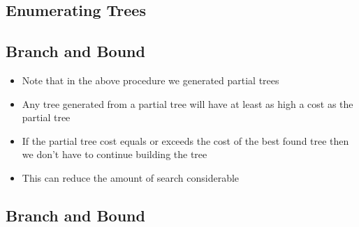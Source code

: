 
\begin{slide}
\section[-2]{Enumerating Trees}

\pause
\pb
{}
\begin{center}
  \pause
\end{center}

\end{slide}


\begin{slide}
\section{Branch and Bound}

\begin{PauseHighLight}
  \begin{itemize}
  \item Note that in the above procedure we generated partial
    trees\pause
  \item Any tree generated from a partial tree will have at least as
    high a cost as the partial tree\pause
  \item If the partial tree cost equals or exceeds the cost of the best
    found tree then we don't have to continue building the tree\pause
  \item This can reduce the amount of search considerable\pause
  \end{itemize}
\end{PauseHighLight}

\end{slide}

\begin{slide}
\section[-2]{Branch and Bound}

\pause
\pb
{}
\begin{center}
  \pause
\end{center}

\end{slide}


